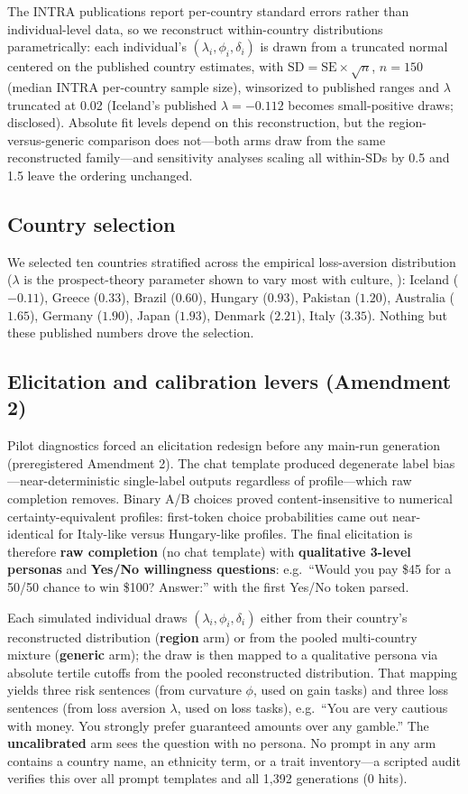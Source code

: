 \documentclass[10pt,letterpaper]{article}
\begin{document}
The INTRA publications report per-country standard errors rather than
individual-level data, so we reconstruct within-country distributions
parametrically: each individual's $(\lambda_i,\phi_i,\delta_i)$ is drawn
from a truncated normal centered on the published country estimates, with
$\mathrm{SD}=\mathrm{SE}\times\sqrt{n}$, $n=150$ (median INTRA per-country
sample size), winsorized to published ranges and $\lambda$ truncated at
0.02 (Iceland's published $\lambda=-0.112$ becomes small-positive draws;
disclosed). Absolute fit levels depend on this reconstruction, but the
region-versus-generic comparison does not---both arms draw from the same
reconstructed family---and sensitivity analyses scaling all within-SDs by
0.5 and 1.5 leave the ordering unchanged.

\subsection{Country selection}

We selected ten countries stratified across the empirical loss-aversion
distribution ($\lambda$ is the prospect-theory parameter shown to vary most
with culture, \citet{wang2017}): Iceland ($-0.11$), Greece ($0.33$), Brazil
($0.60$), Hungary ($0.93$), Pakistan ($1.20$), Australia ($1.65$), Germany
($1.90$), Japan ($1.93$), Denmark ($2.21$), Italy ($3.35$). Nothing but
these published numbers drove the selection.

\subsection{Elicitation and calibration levers (Amendment 2)}

Pilot diagnostics forced an elicitation redesign before any main-run
generation (preregistered Amendment 2). The chat template produced
degenerate label bias---near-deterministic single-label outputs regardless
of profile---which raw completion removes. Binary A/B choices proved
content-insensitive to numerical certainty-equivalent profiles: first-token
choice probabilities came out near-identical for Italy-like versus
Hungary-like profiles. The final elicitation is therefore \textbf{raw
completion} (no chat template) with \textbf{qualitative 3-level personas}
and \textbf{Yes/No willingness questions}: e.g.\ ``Would you pay \$45 for a
50/50 chance to win \$100? Answer:'' with the first Yes/No token parsed.

Each simulated individual draws $(\lambda_i,\phi_i,\delta_i)$ either from
their country's reconstructed distribution (\textbf{region} arm) or from
the pooled multi-country mixture (\textbf{generic} arm); the draw is then
mapped to a qualitative persona via absolute tertile cutoffs from the
pooled reconstructed distribution. That mapping yields three risk
sentences (from curvature $\phi$, used on gain tasks) and three loss
sentences (from loss aversion $\lambda$, used on loss tasks), e.g.\ ``You
are very cautious with money. You strongly prefer guaranteed amounts over
any gamble.'' The \textbf{uncalibrated} arm sees the question with no
persona. No prompt in any arm contains a country name, an ethnicity term,
or a trait inventory---a scripted audit verifies this over all prompt
templates and all 1,392 generations (0 hits).
\end{document}
